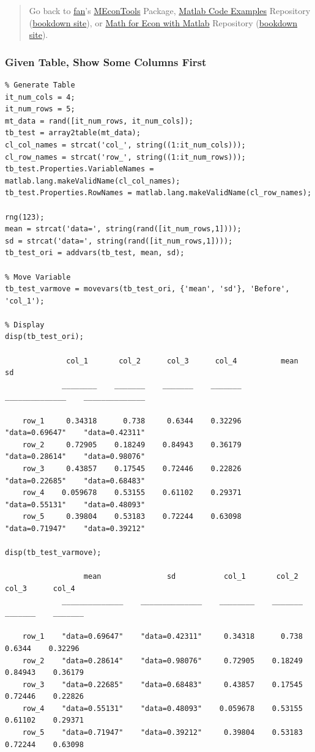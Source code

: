 \documentclass[
]{book}
\begin{document}
\begin{quote}
Go back to \href{http://fanwangecon.github.io/}{fan}'s \href{https://fanwangecon.github.io/MEconTools/}{MEconTools} Package, \href{https://fanwangecon.github.io/M4Econ/}{Matlab Code Examples} Repository (\href{https://fanwangecon.github.io/M4Econ/bookdown}{bookdown site}), or \href{https://fanwangecon.github.io/Math4Econ/}{Math for Econ with Matlab} Repository (\href{https://fanwangecon.github.io/Math4Econ/bookdown}{bookdown site}).
\end{quote}

\hypertarget{given-table-show-some-columns-first}{%
\subsubsection{Given Table, Show Some Columns First}\label{given-table-show-some-columns-first}}

\begin{verbatim}
% Generate Table
it_num_cols = 4;
it_num_rows = 5;
mt_data = rand([it_num_rows, it_num_cols]);
tb_test = array2table(mt_data);
cl_col_names = strcat('col_', string((1:it_num_cols)));
cl_row_names = strcat('row_', string((1:it_num_rows)));
tb_test.Properties.VariableNames = matlab.lang.makeValidName(cl_col_names);
tb_test.Properties.RowNames = matlab.lang.makeValidName(cl_row_names);

rng(123);
mean = strcat('data=', string(rand([it_num_rows,1])));
sd = strcat('data=', string(rand([it_num_rows,1])));
tb_test_ori = addvars(tb_test, mean, sd);

% Move Variable
tb_test_varmove = movevars(tb_test_ori, {'mean', 'sd'}, 'Before', 'col_1');

% Display
disp(tb_test_ori);

              col_1       col_2      col_3      col_4          mean               sd      
             ________    _______    _______    _______    ______________    ______________

    row_1     0.34318      0.738     0.6344    0.32296    "data=0.69647"    "data=0.42311"
    row_2     0.72905    0.18249    0.84943    0.36179    "data=0.28614"    "data=0.98076"
    row_3     0.43857    0.17545    0.72446    0.22826    "data=0.22685"    "data=0.68483"
    row_4    0.059678    0.53155    0.61102    0.29371    "data=0.55131"    "data=0.48093"
    row_5     0.39804    0.53183    0.72244    0.63098    "data=0.71947"    "data=0.39212"

disp(tb_test_varmove);

                  mean               sd           col_1       col_2      col_3      col_4 
             ______________    ______________    ________    _______    _______    _______

    row_1    "data=0.69647"    "data=0.42311"     0.34318      0.738     0.6344    0.32296
    row_2    "data=0.28614"    "data=0.98076"     0.72905    0.18249    0.84943    0.36179
    row_3    "data=0.22685"    "data=0.68483"     0.43857    0.17545    0.72446    0.22826
    row_4    "data=0.55131"    "data=0.48093"    0.059678    0.53155    0.61102    0.29371
    row_5    "data=0.71947"    "data=0.39212"     0.39804    0.53183    0.72244    0.63098
\end{verbatim}
\end{document}
